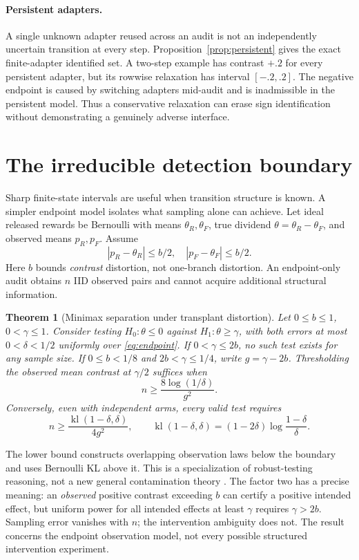 \documentclass{article}
\newtheorem{theorem}{Theorem}
\theoremstyle{definition}
\newcommand{\kl}{\operatorname{kl}}
\begin{document}
\paragraph{Persistent adapters.}
A single unknown adapter reused across an audit is not an independently uncertain transition at every step. Proposition~\ref{prop:persistent} gives the exact finite-adapter identified set. A two-step example has contrast $+.2$ for every persistent adapter, but its rowwise relaxation has interval $[-.2,.2]$. The negative endpoint is caused by switching adapters mid-audit and is inadmissible in the persistent model. Thus a conservative relaxation can erase sign identification without demonstrating a genuinely adverse interface.

\section{The irreducible detection boundary}\label{sec:boundary}
Sharp finite-state intervals are useful when transition structure is known. A simpler endpoint model isolates what sampling alone can achieve. Let ideal released rewards be Bernoulli with means $\theta_R,\theta_F$, true dividend $\theta=\theta_R-\theta_F$, and observed means $p_R,p_F$. Assume
\begin{equation}
 |p_R-\theta_R|\leq b/2,\quad |p_F-\theta_F|\leq b/2.\label{eq:endpoint}
\end{equation}
Here $b$ bounds \emph{contrast} distortion, not one-branch distortion. An endpoint-only audit obtains $n$ IID observed pairs and cannot acquire additional structural information.

\begin{theorem}[Minimax separation under transplant distortion]\label{thm:gap}
Let $0\leq b\leq1$, $0<\gamma\leq1$. Consider testing $H_0:\theta\leq0$ against $H_1:\theta\geq\gamma$, with both errors at most $0<\delta<1/2$ uniformly over \eqref{eq:endpoint}. If $0<\gamma\leq2b$, no such test exists for any sample size. If $0\leq b<1/8$ and $2b<\gamma\leq1/4$, write $g=\gamma-2b$. Thresholding the observed mean contrast at $\gamma/2$ suffices when
\begin{equation}
 n\geq\frac{8\log(1/\delta)}{g^2}.
\end{equation}
Conversely, even with independent arms, every valid test requires
\begin{equation}
 n\geq\frac{\kl(1-\delta,\delta)}{4g^2},\qquad
 \kl(1-\delta,\delta)=(1-2\delta)\log\frac{1-\delta}{\delta}.\label{eq:lower}
\end{equation}
\end{theorem}
The lower bound constructs overlapping observation laws below the boundary and uses Bernoulli KL above it. This is a specialization of robust-testing reasoning, not a new general contamination theory \citep{chen,vallinayagam}. The factor two has a precise meaning: an \emph{observed} positive contrast exceeding $b$ can certify a positive intended effect, but uniform power for all intended effects at least $\gamma$ requires $\gamma>2b$. Sampling error vanishes with $n$; the intervention ambiguity does not. The result concerns the endpoint observation model, not every possible structured intervention experiment.
\end{document}
